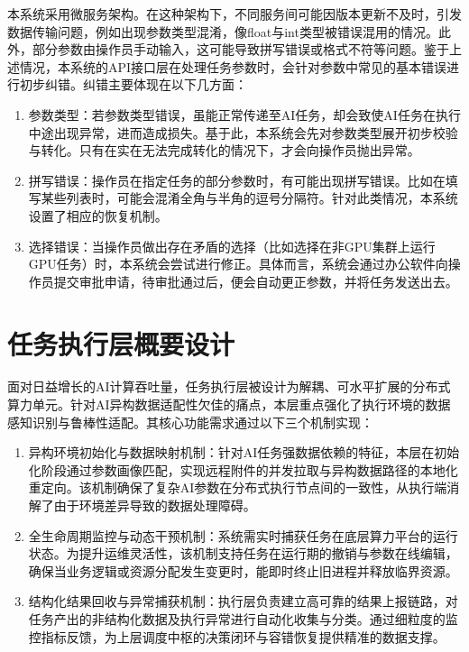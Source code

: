 本系统采用微服务架构。在这种架构下，不同服务间可能因版本更新不及时，引发数据传输问题，例如出现参数类型混淆，像float与int类型被错误混用的情况。此外，部分参数由操作员手动输入，这可能导致拼写错误或格式不符等问题。鉴于上述情况，本系统的API接口层在处理任务参数时，会针对参数中常见的基本错误进行初步纠错。纠错主要体现在以下几方面：
\begin{enumerate}
	\item 参数类型：若参数类型错误，虽能正常传递至AI任务，却会致使AI任务在执行中途出现异常，进而造成损失。基于此，本系统会先对参数类型展开初步校验与转化。只有在实在无法完成转化的情况下，才会向操作员抛出异常。
	\item 拼写错误：操作员在指定任务的部分参数时，有可能出现拼写错误。比如在填写某些列表时，可能会混淆全角与半角的逗号分隔符。针对此类情况，本系统设置了相应的恢复机制。
	\item 选择错误：当操作员做出存在矛盾的选择（比如选择在非GPU集群上运行GPU任务）时，本系统会尝试进行修正。具体而言，系统会通过办公软件向操作员提交审批申请，待审批通过后，便会自动更正参数，并将任务发送出去。
\end{enumerate}

\section{任务执行层概要设计}

面对日益增长的AI计算吞吐量，任务执行层被设计为解耦、可水平扩展的分布式算力单元。针对AI异构数据适配性欠佳的痛点，本层重点强化了执行环境的数据感知识别与鲁棒性适配。其核心功能需求通过以下三个机制实现：

\begin{enumerate}
    \item 异构环境初始化与数据映射机制：针对AI任务强数据依赖的特征，本层在初始化阶段通过参数画像匹配，实现远程附件的并发拉取与异构数据路径的本地化重定向。该机制确保了复杂AI参数在分布式执行节点间的一致性，从执行端消解了由于环境差异导致的数据处理障碍。
    \item 全生命周期监控与动态干预机制：系统需实时捕获任务在底层算力平台的运行状态。为提升运维灵活性，该机制支持任务在运行期的撤销与参数在线编辑，确保当业务逻辑或资源分配发生变更时，能即时终止旧进程并释放临界资源。
    \item 结构化结果回收与异常捕获机制：执行层负责建立高可靠的结果上报链路，对任务产出的非结构化数据及执行异常进行自动化收集与分类。通过细粒度的监控指标反馈，为上层调度中枢的决策闭环与容错恢复提供精准的数据支撑。
\end{enumerate}

